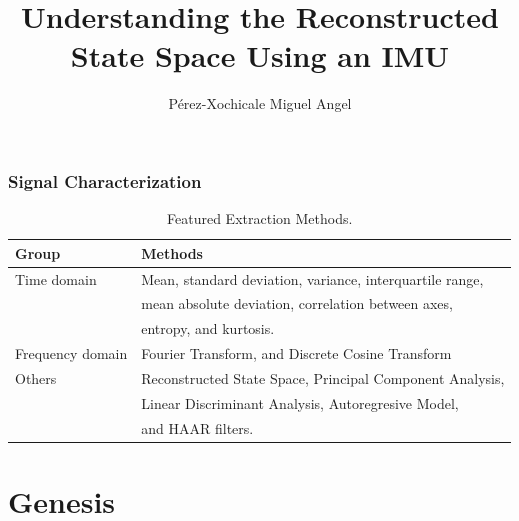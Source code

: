 \documentclass[
first,
ETH1,
navigation
]{ETHbeamerclass}
\title{Understanding the Reconstructed State Space Using an IMU}
\author{P\'erez-Xochicale Miguel Angel}
\date{}
\institute{}
\begin{document}
\frame{
\maketitle
}
\note{}



\note{}


\begin{bibunit}[apalike]
\begin{frame}
\frametitle{Signal Characterization}

\begin{table}[h]
 \label{t:typesofHAR}
\scriptsize{
\begin{tabular}{|l|l |}
\hline
\textbf{Group}& \textbf{Methods} \\ \hline
Time domain & Mean, standard deviation, variance, interquartile range,\\
        & mean absolute deviation, correlation between axes,\\
        & entropy, and kurtosis. \\ \hline  
Frequency domain & Fourier Transform, and Discrete Cosine Transform \\ \hline  
Others & Reconstructed State Space, Principal Component Analysis, \\
      & Linear Discriminant Analysis, Autoregresive Model, \\
      & and HAAR filters.\\ \hline
\end{tabular}}
\caption{Featured Extraction Methods\cite{Lara2013}.}
\end{table}
\end{frame}
\end{bibunit}





\section{Genesis} %
\end{document}
